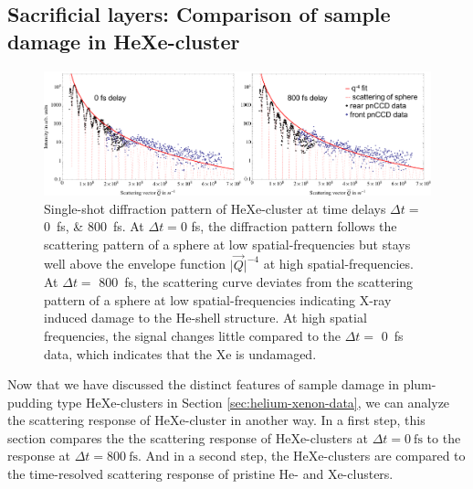 \subsection{Sacrificial layers: Comparison of sample damage in HeXe-cluster}\label{sec:comparison-of-He-and-HeXe-clusters}
%
\begin{figure}
	\centering
		\includegraphics[width=1.00\textwidth]{images/results/HeXe-comparison-0-800-fs.png}
	\caption[Single-shot diffraction patterns of HeXe-cluster at different time delays]{Single-shot diffraction pattern of HeXe-cluster at time delays $\Delta t =$ 
	\SIlist{0;800}{\femto\second}. At $\Delta t=0$ fs, the diffraction pattern follows the scattering pattern of a sphere at low spatial-frequencies but stays well above the envelope function $\lvert\vec{Q}\rvert^{-4}$ at high spatial-frequencies. At $\Delta t=$ \SI{800}{\femto\second}, the scattering curve deviates from the scattering pattern of a sphere at low spatial-frequencies indicating X-ray induced damage to the He-shell structure. At high spatial frequencies, the signal changes little compared to the $\Delta t=$ \SI{0}{\femto\second} data, which indicates that the Xe is undamaged.
	}
	\label{fig:HeXe-comparison-0-800-fs}
\end{figure}
%
Now that we have discussed the distinct features of sample damage in plum-pudding type HeXe-clusters in Section \ref{sec:helium-xenon-data}, we can analyze the scattering response of HeXe-cluster in another way. In a first step, this section compares the the scattering response of HeXe-clusters at $\Delta t=\SI{0}{\femto\second}$ to the response at  $\Delta t=\SI{800}{\femto\second}$. And in a second step, the HeXe-clusters are compared to the time-resolved scattering response of pristine He- and Xe-clusters.\\[1\baselineskip]
%
